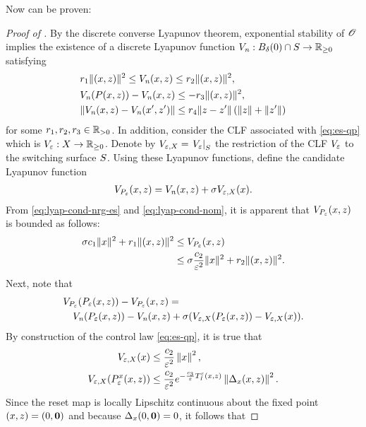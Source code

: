 \documentclass[twocolumn]{article}
\begin{document}
Now  can be proven:
\begin{proof} [Proof of ]
  By the discrete converse Lyapunov theorem, exponential stability of $\Orbit$ implies the existence of a discrete Lyapunov function $\Vn : B_{\delta}(0) \cap \S \to \Rnn$ satisfying
  \begin{eqnarray}
    \label{eq:lyap-cond-nom}
    &r_{1} \| \argsxz \|^{2} \leq \Vn\argsxz \leq r_{2} \| \argsxz \|^2,\\
    \nonumber
    &\Vn(\P\argsxz) - \Vn\argsxz \leq -r_{3} \| \argsxz \|^{2},\\
    \nonumber
    &\| \Vn\argsxz - \Vn(\zdx', \zdz') \| \leq r_{4} \| \zdz - \zdz' \| \left( \|\zdz\| + \|\zdz'\|\right)
  \end{eqnarray}
  for some $r_{1}, r_{2}, r_{3} \in \Rpd$.
  In addition, consider the CLF associated with \eqref{eq:es-qp} which is $\Ve : \zdX \to \Rnn$.
  Denote by $\Vex = \VeS$ the restriction of the CLF $\Ve$ to the switching surface $\S$.
  Using these Lyapunov functions, define the candidate Lyapunov function
  \begin{align}
    \VP\argsxz = \Vn\argsxz + \sigma \Vex(\zdx).
  \end{align}
  From \eqref{eq:lyap-cond-nrg-es} and \eqref{eq:lyap-cond-nom}, it is apparent that $\VP\argsxz$ is bounded as follows:
  \begin{align}
    \sigma c_{1} \| \zdx \|^{2} + r_{1} \| \argsxz \|^{2} &\leq \VP\argsxz\\
    \nonumber
    &\leq \sigma \frac{c_{2}}{\resclfparam^{2}} \| \zdx \|^{2} + r_{2} \| \argsxz \|^{2}.
  \end{align}
  Next, note that
  \begin{align}
    \lefteqn{\VP(\Pe\argsxz) - \VP\argsxz =}\\
    \nonumber
      &&\Vn(\Pe\argsxz) - \Vn\argsxz + \sigma(\Vex(\Pe\argsxz) - \Vex(\zdx)).
  \end{align}
  By construction of the control law \eqref{eq:es-qp}, it is true that
  \begin{align}
    \label{eq:Veh-bound}
    \Vex(\zdx) &\leq \frac{c_{2}}{\resclfparam^{2}} \left\| \zdx \right\|^{2},\\
    \nonumber
    \Vex(\Pe^{\zdx}\argsxz) &\leq \frac{c_{2}}{\resclfparam^{2}} e^{-\frac{c_{3}}{\resclfparam} \TIe\argsxz} \left\| \Delta_{\zdx}\argsxz \right\|^{2}.
  \end{align}
  Since the reset map is locally Lipschitz continuous about the fixed point $\argsxz = (0, \boldzero)$ and because $\Delta_{x}(0, \boldzero) = 0$, it follows that

\end{proof}
\end{document}

